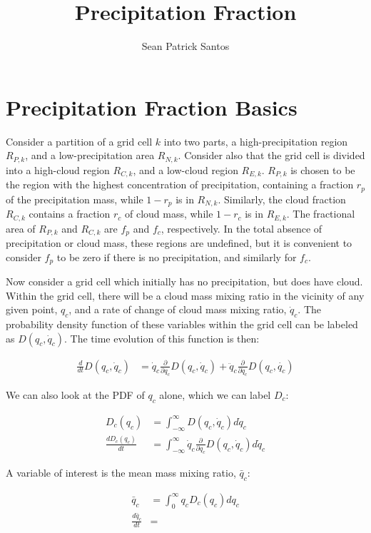 \documentclass[12pt]{article}[2007/10/19]
\title{Precipitation Fraction}
\author{Sean Patrick Santos}
\begin{document}
\maketitle

\section{Precipitation Fraction Basics}

Consider a partition of a grid cell $k$ into two parts, a high-precipitation
region $R_{P,k}$, and a low-precipitation area $R_{N,k}$. Consider also that the
grid cell is divided into a high-cloud region $R_{C,k}$, and a low-cloud region
$R_{E,k}$. $R_{P,k}$ is chosen to be the region with the highest concentration
of precipitation, containing a fraction $r_p$ of the precipitation mass, while
$1-r_p$ is in $R_{N,k}$. Similarly, the cloud fraction $R_{C,k}$ contains a
fraction $r_c$ of cloud mass, while $1-r_c$ is in $R_{E,k}$. The fractional area
of $R_{P,k}$ and $R_{C,k}$ are $f_p$ and $f_c$, respectively. In the total
absence of precipitation or cloud mass, these regions are undefined, but it is
convenient to consider $f_p$ to be zero if there is no precipitation, and
similarly for $f_c$.

Now consider a grid cell which initially has no precipitation, but does have
cloud. Within the grid cell, there will be a cloud mass mixing ratio in the
vicinity of any given point, $q_c$, and a rate of change of cloud mass mixing
ratio, $\dot{q}_c$. The probability density function of these variables within
the grid cell can be labeled as $D(q_c, \dot{q}_c)$. The time evolution of
this function is then:

\begin{align}
  \frac{d}{d t} D(q_c, \dot{q}_c) &= \dot{q}_c \frac{\partial}{\partial q_c}
  D(q_c, \dot{q}_c) + \ddot{q}_c \frac{\partial}{\partial \dot{q}_c} D(q_c,
  \dot{q_c})
\end{align}

We can also look at the PDF of $q_c$ alone, which we can label $D_c$:

\begin{align}
  D_c(q_c) &= \int_{-\infty}^\infty D(q_c, \dot{q}_c) d\dot{q}_c \\ \frac{d
    D_c(q_c)}{dt} &= \int_{-\infty}^\infty \dot{q}_c \frac{\partial}{\partial q_c} D(q_c, \dot{q}_c)
  d\dot{q}_c
\end{align}

A variable of interest is the mean mass mixing ratio, $\bar{q}_c$:

\begin{align}
  \bar{q}_c &= \int_0^\infty q_c D_c(q_c) dq_c \\
  \frac{d \bar{q}_c}{dt} &= 
\end{align}
\end{document}
